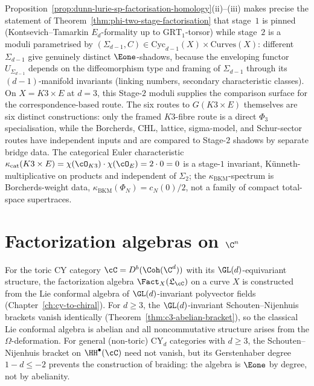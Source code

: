 \begin{remark}
\label{rem:sigma-c-moduli-e1-shadows}
Proposition~\ref{prop:dunn-lurie-sp-factorisation-homology}(ii)--(iii) makes precise the statement of Theorem~\ref{thm:phi-two-stage-factorisation} that stage~$1$ is pinned (Kontsevich--Tamarkin $E_d$-formality up to $\mathrm{GRT}_1$-torsor) while stage~$2$ is a moduli parametrised by $(\Sigma_{d-1}, C) \in \mathrm{Cyc}_{d-1}(X) \times \mathrm{Curves}(X)$: different $\Sigma_{d-1}$ give genuinely distinct $\Eone$-shadows, because the enveloping functor $U_{\Sigma_{d-1}}$ depends on the diffeomorphism type and framing of $\Sigma_{d-1}$ through its $(d{-}1)$-manifold invariants (linking numbers, secondary characteristic classes). On $X = K3 \times E$ at $d = 3$, this Stage-$2$ moduli supplies the comparison surface for the correspondence-based route. The six routes to $G(K3 \times E)$ themselves are six distinct constructions: only the framed $K3$-fibre route is a direct $\Phi_3$ specialisation, while the Borcherds, CHL, lattice, sigma-model, and Schur-sector routes have independent inputs and are compared to Stage-$2$ shadows by separate bridge data. The categorical Euler characteristic $\kappa_{\mathrm{cat}}(K3 \times E) = \chi(\cO_{K3}) \cdot \chi(\cO_E) = 2 \cdot 0 = 0$ is a stage-$1$ invariant, K\"unneth-multiplicative on products and independent of $\Sigma_2$; the $\kappa_{\mathrm{BKM}}$-spectrum is Borcherds-weight data, $\kappa_{\mathrm{BKM}}(\Phi_N)=c_N(0)/2$, not a family of compact total-space supertraces.
\end{remark}


\section{Factorization algebras on \texorpdfstring{$\C^n$}{C-n}}
\label{sec:fact-cn}

For the toric CY category $\cC = D^b(\Coh(\C^d))$ with its $\GL(d)$-equivariant structure, the factorization algebra $\Fact_X(\mathfrak{L}_\cC)$ on a curve $X$ is constructed from the Lie conformal algebra of $\GL(d)$-invariant polyvector fields (Chapter~\ref{ch:cy-to-chiral}). For $d \geq 3$, the $\GL(d)$-invariant Schouten--Nijenhuis brackets vanish identically (Theorem~\ref{thm:c3-abelian-bracket}), so the classical Lie conformal algebra is abelian and all noncommutative structure arises from the $\Omega$-deformation. For general (non-toric) CY$_d$ categories with $d \geq 3$, the Schouten--Nijenhuis bracket on $\HH^\bullet(\cC)$ need not vanish, but its Gerstenhaber degree $1 - d \leq -2$ prevents the construction of braiding: the algebra is $\Eone$ by degree, not by abelianity.

